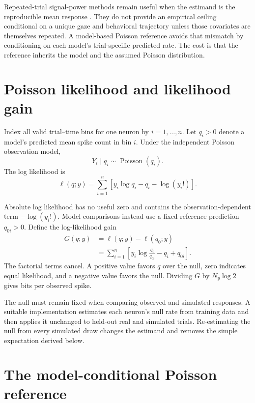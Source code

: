 \documentclass[11pt]{article}
\newcommand{\Pois}{\operatorname{Poisson}}
\begin{document}
Repeated-trial signal-power methods remain useful when the estimand is the reproducible mean response \cite{sahani2003,hsu2004,schoppe2016,pospisil2021}. They do not provide an empirical ceiling conditional on a unique gaze and behavioral trajectory unless those covariates are themselves repeated. A model-based Poisson reference avoids that mismatch by conditioning on each model's trial-specific predicted rate. The cost is that the reference inherits the model and the assumed Poisson distribution.

\section{Poisson likelihood and likelihood gain}

Index all valid trial--time bins for one neuron by $i=1,\ldots,n$. Let $q_i>0$ denote a model's predicted mean spike count in bin $i$. Under the independent Poisson observation model,
\begin{equation}
Y_i\mid q_i\sim\Pois(q_i).
\end{equation}
The log likelihood is
\begin{equation}
\ell(q;y)
=
\sum_{i=1}^n
\left[
 y_i\log q_i-q_i-\log(y_i!)
\right].
\label{eq:poisson_ll}
\end{equation}

Absolute log likelihood has no useful zero and contains the observation-dependent term $-\log(y_i!)$. Model comparisons instead use a fixed reference prediction $q_{0i}>0$. Define the log-likelihood gain
\begin{align}
G(q;y)
&=\ell(q;y)-\ell(q_0;y)\\
&=\sum_{i=1}^n
\left[
 y_i\log\frac{q_i}{q_{0i}}-q_i+q_{0i}
\right].
\label{eq:gain}
\end{align}
The factorial terms cancel. A positive value favors $q$ over the null, zero indicates equal likelihood, and a negative value favors the null. Dividing $G$ by $N_y\log 2$ gives bits per observed spike.

The null must remain fixed when comparing observed and simulated responses. A suitable implementation estimates each neuron's null rate from training data and then applies it unchanged to held-out real and simulated trials. Re-estimating the null from every simulated draw changes the estimand and removes the simple expectation derived below.

\section{The model-conditional Poisson reference}
\end{document}

